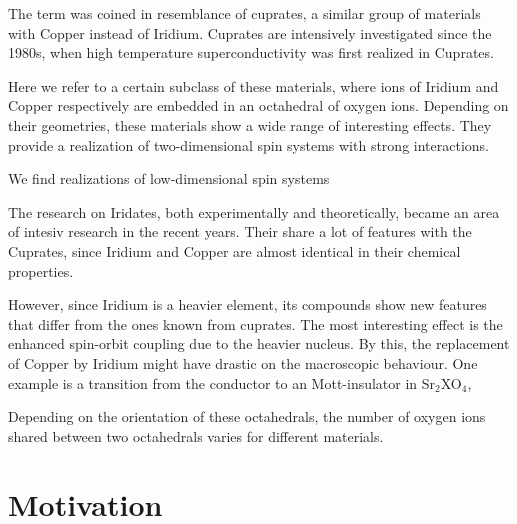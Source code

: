 \documentclass[a4paper,10pt]{report}
\begin{document}

The term was coined in resemblance of cuprates, a similar group of materials with Copper instead of Iridium.
Cuprates are intensively investigated since the 1980s, when high temperature superconductivity was first realized in Cuprates.


Here we refer to a certain subclass of these materials, where ions of Iridium and Copper respectively are embedded in an octahedral of oxygen ions.
Depending on their geometries, these materials show a wide range of interesting effects.
They provide a realization of two-dimensional spin systems with strong interactions. 




We find realizations of low-dimensional spin systems

The research on Iridates, both experimentally and theoretically, became an area of intesiv research in the recent years. 
Their share a lot of features with the Cuprates, since Iridium and Copper are almost identical in their chemical properties. 

However, since Iridium is a heavier element, its compounds show new features that differ from the ones known from cuprates.
The most interesting effect is the enhanced spin-orbit coupling due to the heavier nucleus.
By this, the replacement of Copper by Iridium might have drastic on the macroscopic behaviour. 
One example is a transition from the conductor to an Mott-insulator in Sr$_2$XO$_4$, 

Depending on the orientation of these octahedrals, the number of oxygen ions shared between two octahedrals varies for different materials. 





\section{Motivation}

\end{document}
